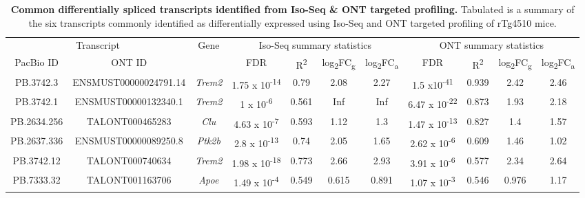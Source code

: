 \begin{landscape}
\begin{table}[]
	\centering
	\captionsetup{width=1.5\textwidth}
	\caption[Common differentially spliced transcripts identified targeted profiling]%
	{\textbf{Common differentially spliced transcripts identified from Iso-Seq \& ONT targeted profiling.} Tabulated is a summary of the six transcripts commonly identified as differentially expressed using Iso-Seq and ONT targeted profiling of rTg4510 mice.}
	\label{tab_diffcommon}
	\setlength\tabcolsep{7pt} %
	\begin{threeparttable}
	\begin{tabular}{@{}ccccccccccc@{}}
		\toprule
		\multicolumn{2}{c}{Transcript} & \multirow{2}{*}{Gene} & \multicolumn{4}{c}{Iso-Seq summary statistics} & \multicolumn{4}{c}{ONT summary statistics} \\ \cmidrule(r){1-2} \cmidrule(l){4-11} 
		PacBio ID   & ONT ID\tnote{a}                &       & FDR\tnote{b}      & R\textsuperscript{2}\tnote{,c}     & log\textsubscript{2}FC\textsubscript{g}\tnote{d} & log\textsubscript{2}FC\textsubscript{a}\tnote{e} & FDR\tnote{b}      & R\textsuperscript{2}\tnote{,c}     & log\textsubscript{2}FC\textsubscript{g}\tnote{d} & log\textsubscript{2}FC\textsubscript{a}\tnote{e} \\ \midrule
		PB.3742.3   & ENSMUST00000024791.14 & \textit{Trem2} & 1.75 x 10\textsuperscript{-14} & 0.79  & 2.08   & 2.27   & 1.5 x10\textsuperscript{-41}  & 0.939 & 2.42   & 2.46   \\
		PB.3742.1   & ENSMUST00000132340.1  & \textit{Trem2} & 1 x 10\textsuperscript{-6} & 0.561 & Inf    & Inf    & 6.47 x 10\textsuperscript{-22} & 0.873 & 1.93   & 2.18   \\
		PB.2634.256 & TALONT000465283       & \textit{Clu}   & 4.63 x 10\textsuperscript{-7} & 0.593 & 1.12   & 1.3    & 1.47 x 10\textsuperscript{-13} & 0.827 & 1.4    & 1.57   \\
		PB.2637.336 & ENSMUST00000089250.8  & \textit{Ptk2b} & 2.8 x 10\textsuperscript{-13}  & 0.74  & 2.05   & 1.65   & 2.62 x 10\textsuperscript{-6} & 0.609 & 1.46   & 1.02   \\
		PB.3742.12  & TALONT000740634       & \textit{Trem2} & 1.98 x 10\textsuperscript{-18} & 0.773 & 2.66   & 2.93   & 3.91 x 10\textsuperscript{-6} & 0.577 & 2.34   & 2.64   \\
		PB.7333.32  & TALONT001163706       & \textit{Apoe}  & 1.49 x 10\textsuperscript{-4} & 0.549 & 0.615  & 0.891  & 1.07 x 10\textsuperscript{-3}  & 0.546 & 0.976  & 1.17   \\ \bottomrule

\end{tabular}
\end{threeparttable}
\end{table}
\end{landscape}
